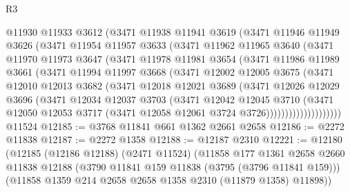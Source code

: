\begin{lexlean}{R3}
\begin{coremodule}
            @11930
            @11933
            @3612
            (@3471
              @11938
              @11941
              @3619
              (@3471
                @11946
                @11949
                @3626
                (@3471
                  @11954
                  @11957
                  @3633
                  (@3471
                    @11962
                    @11965
                    @3640
                    (@3471
                      @11970
                      @11973
                      @3647
                      (@3471
                        @11978
                        @11981
                        @3654
                        (@3471
                          @11986
                          @11989
                          @3661
                          (@3471
                            @11994
                            @11997
                            @3668
                            (@3471
                              @12002
                              @12005
                              @3675
                              (@3471
                                @12010
                                @12013
                                @3682
                                (@3471
                                  @12018
                                  @12021
                                  @3689
                                  (@3471
                                    @12026
                                    @12029
                                    @3696
                                    (@3471
                                      @12034
                                      @12037
                                      @3703
                                      (@3471
                                        @12042
                                        @12045
                                        @3710
                                        (@3471
                                          @12050
                                          @12053
                                          @3717
                                          (@3471 @12058 @12061 @3724 @3726))))))))))))))))))))
    @11524
@12185 := @3768 @11841 @661 @1362 @2661 @2658
@12186 := @2272 @11838
@12187 := @2272 @1358
@12188 := @12187 @2310
@12221 := @12180
    (@12185
      (@12186 @12188)
      (@2471 @11524)
      (@11858
        @177
        @1361
        @2658
        @2660
        @11838
        @12188
        (@3790 @11841 @159 @11838 (@3795 (@3796 @11841 @159)))
        (@11858 @1359 @214 @2658 @2658 @1358 @2310 (@11879 @1358) @11898))

\end{coremodule}
\end{lexlean}
